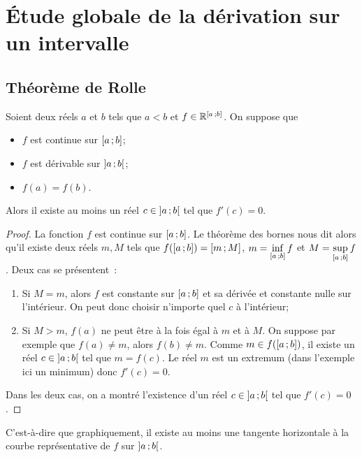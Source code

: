 \section{Étude globale de la dérivation sur un intervalle}

\subsection{Théorème de Rolle}

\begin{theo}
  Soient deux réels \(a\) et \(b\) tels que \(a < b\) et \(f \in \mathbb{R}^{\left[ a \, ;  b \right]}\). On suppose que
  \begin{itemize}
  \item \(f\) est continue sur \(\left[ a \, ;  b \right]\);
  \item \(f\) est dérivable sur \(\left] a \, ;  b \right[\);
  \item \(f(a)=f(b)\).
  \end{itemize}
  Alors il existe au moins un réel \(c \in \left] a \, ;  b \right[\) tel que \(f'(c)=0\).
\end{theo}
\begin{proof}
  La fonction \(f\) est continue sur \(\left[ a \, ;  b \right]\). Le théorème des bornes nous dit alors qu'il existe deux réels \(m,M\) tels que \(f(\left[ a \, ;  b \right])=\left[ m \, ;  M \right]\), \(m = \inf\limits_{\left[ a \, ;  b \right]} f\) et \(M = \sup\limits_{\left[ a \, ;  b \right]} f\). Deux cas se présentent~:
  \begin{enumerate}
  \item Si \(M=m\), alors \(f\) est constante sur \(\left[ a \, ;  b \right]\) et sa dérivée et constante nulle sur l'intérieur. On peut donc choisir n'importe quel \(c\) à l'intérieur;
  \item Si \(M > m\), \(f(a)\) ne peut être à la fois égal à \(m\) et à \(M\). On suppose par exemple que \(f(a) \neq m\), alors \(f(b) \neq m\). Comme \(m \in f(\left[ a \, ;  b \right])\), il existe un réel \(c \in \left] a \, ;  b \right[\) tel que \(m=f(c)\). Le réel \(m\) est un extremum (dans l'exemple ici un minimum) donc \(f'(c)=0\).
  \end{enumerate}
  Dans les deux cas, on a montré l'existence d'un réel \(c \in \left] a \, ;  b \right[\) tel que \(f'(c)=0\).
\end{proof}

C'est-à-dire que graphiquement, il existe au moins une tangente horizontale à la courbe représentative de \(f\) sur \(\left] a \, ;  b \right[\).

